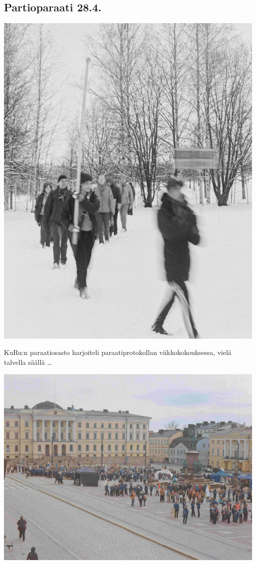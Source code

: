 \documentclass[10pt,finnish,a5paper,headings=small,twoside=semi]{scrartcl}
\begin{document}
\clearpage
\subsection{Partioparaati 28.4.}

\vspace*{-0.32cm}
\begin{multicols}{2}

	\begin{center}
		\noindent\includegraphics[width=0.9\linewidth]{assets/paraati1}
	\end{center}

	\vspace*{-0.32cm}
	\small KuRu:n paraatiosasto harjoiteli \mbox{paraati}protokollan
	viikkokokouksessa, vielä talvella säällä \ldots

	\begin{center}
		\noindent\includegraphics[width=0.9\linewidth]{assets/paraati4}
	\end{center}


\end{multicols}
\end{document}
